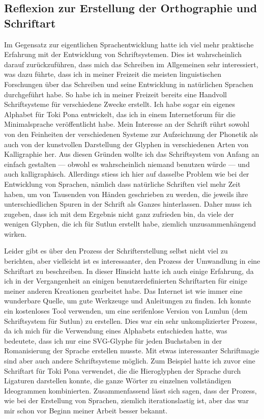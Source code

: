 \documentclass{article}
\begin{document}
\subsection{Reflexion zur Erstellung der Orthographie und Schriftart}
Im Gegensatz zur eigentlichen Sprachentwicklung hatte ich viel mehr praktische Erfahrung mit der Entwicklung
von Schriftsystemen. Dies ist wahrscheinlich darauf zurückzuführen, dass mich das Schreiben im Allgemeinen sehr
interessiert, was dazu führte, dass ich in meiner Freizeit die meisten linguistischen Forschungen über
das Schreiben und seine Entwicklung in natürlichen Sprachen durchgeführt habe.
So habe ich in meiner Freizeit bereits eine Handvoll Schriftsysteme für verschiedene Zwecke erstellt.
Ich habe sogar ein eigenes Alphabet für Toki Pona entwickelt, das ich in einem Internetforum für die
Minimalsprache veröffentlicht habe. Mein Interesse an der Schrift rührt sowohl von den Feinheiten der
verschiedenen Systeme zur Aufzeichnung der Phonetik als auch von der kunstvollen Darstellung der Glyphen
in verschiedenen Arten von Kalligraphie her. Aus diesen Gründen wollte ich das Schriftsystem von Anfang
an einfach gestalten --- obwohl es wahrscheinlich niemand benutzen würde --- und auch kalligraphisch.
Allerdings stiess ich hier auf dasselbe Problem wie bei der Entwicklung von Sprachen,
nämlich dass natürliche Schriften viel mehr Zeit haben, um von Tausenden von Händen geschrieben zu werden,
die jeweils ihre unterschiedlichen Spuren in der Schrift als Ganzes hinterlassen. Daher muss ich zugeben,
dass ich mit dem Ergebnis nicht ganz zufrieden bin, da viele der wenigen Glyphen,
die ich für Sutlun erstellt habe, ziemlich unzusammenhängend wirken.

Leider gibt es über den Prozess der Schrifterstellung selbst nicht viel zu berichten,
aber vielleicht ist es interessanter, den Prozess der Umwandlung in eine Schriftart zu beschreiben.
In dieser Hinsicht hatte ich auch einige Erfahrung, da ich in der Vergangenheit an einigen
benutzerdefinierten Schriftarten für einige meiner anderen Kreationen gearbeitet habe.
Das Internet ist wie immer eine wunderbare Quelle, um gute Werkzeuge und Anleitungen zu finden.
Ich konnte ein kostenloses Tool verwenden, um eine serifenlose Version von Lumlun (dem Schriftsystem für Sutlun)
zu erstellen. Dies war ein sehr unkomplizierter Prozess, da ich mich für die Verwendung eines
Alphabets entschieden hatte, was bedeutete, dass ich nur eine SVG-Glyphe für jeden Buchstaben
in der Romanisierung der Sprache erstellen musste. Mit etwas interessanter Schriftmagie sind
aber auch andere Schriftsysteme möglich. Zum Beispiel hatte ich zuvor eine Schriftart für Toki Pona verwendet,
die die Hieroglyphen der Sprache durch Ligaturen darstellen konnte, die ganze Wörter zu einzelnen vollständigen
Ideogrammen kombinierten. Zusammenfassend lässt sich sagen, dass der Prozess, wie bei der Erstellung von Sprachen,
ziemlich iterationslastig ist, aber das war mir schon vor Beginn meiner Arbeit besser bekannt.
\end{document}
